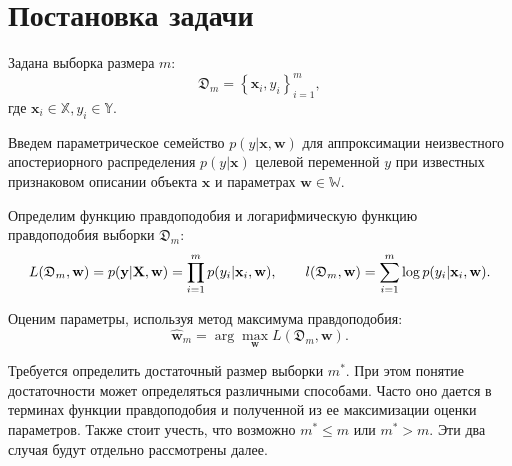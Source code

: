 \section{Постановка задачи}\label{sec1}

Задана выборка размера $m$:
\[ \mathfrak{D}_m = \left\{ \mathbf{x}_i, y_i \right\}_{i = 1}^{m}, \]
где $\mathbf{x}_i \in \mathbb{X}, y_i \in \mathbb{Y}$.

Введем параметрическое семейство $p(y | \mathbf{x}, \mathbf{w})$ для аппроксимации неизвестного апостериорного распределения $p(y | \mathbf{x})$ целевой переменной $y$ при известных признаковом описании объекта $\mathbf{x}$ и параметрах $\mathbf{w} \in \mathbb{W}$. 

Определим функцию правдоподобия и логарифмическую функцию правдоподобия выборки $\mathfrak{D}_m$:
\[ L(\mathfrak{D}_m, \mathbf{w}) = p(\mathbf{y} | \mathbf{X}, \mathbf{w}) = \prod_{i=1}^{m} p(y_i | \mathbf{x}_i, \mathbf{w}), \qquad l(\mathfrak{D}_m, \mathbf{w}) = \sum\limits_{i=1}^{m} \log p(y_i | \mathbf{x}_i, \mathbf{w}). \]

Оценим параметры, используя метод максимума правдоподобия:
\[ \hat{\mathbf{w}}_{m} = \arg\max_{\mathbf{w}} L(\mathfrak{D}_m, \mathbf{w}). \]

Требуется определить достаточный размер выборки $m^*$. При этом понятие достаточности может определяться различными способами. Часто оно дается в терминах функции правдоподобия и полученной из ее максимизации оценки параметров. Также стоит учесть, что возможно $m^* \leqslant m$ или $m^* > m$. Эти два случая будут отдельно рассмотрены далее.